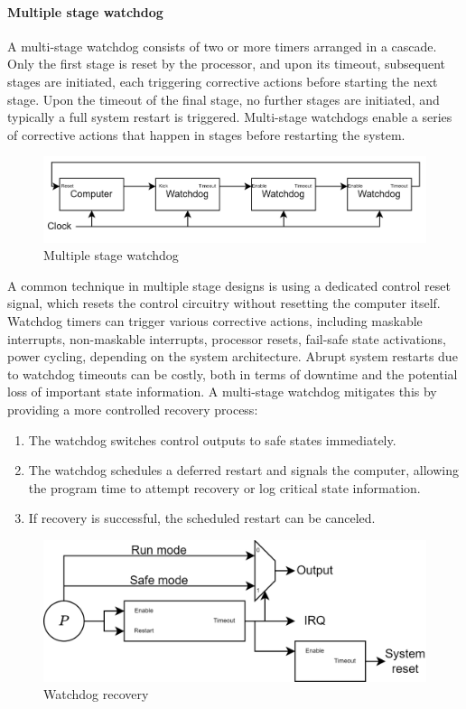\paragraph*{Multiple stage watchdog}
A multi-stage watchdog consists of two or more timers arranged in a cascade. 
Only the first stage is reset by the processor, and upon its timeout, subsequent stages are initiated, each triggering corrective actions before starting the next stage.
Upon the timeout of the final stage, no further stages are initiated, and typically a full system restart is triggered.
Multi-stage watchdogs enable a series of corrective actions that happen in stages before restarting the system.
\begin{figure}[H]
    \centering
    \includegraphics[width=0.75\linewidth]{images/swdog1.png}
    \caption{Multiple stage watchdog}
\end{figure}
A common technique in multiple stage designs is using a dedicated control reset signal, which resets the control circuitry without resetting the computer itself. 
Watchdog timers can trigger various corrective actions, including maskable interrupts, non-maskable interrupts, processor resets, fail-safe state activations, power cycling, depending on the system architecture.
Abrupt system restarts due to watchdog timeouts can be costly, both in terms of downtime and the potential loss of important state information. 
A multi-stage watchdog mitigates this by providing a more controlled recovery process:
\begin{enumerate}
    \item The watchdog switches control outputs to safe states immediately.
    \item The watchdog schedules a deferred restart and signals the computer, allowing the program time to attempt recovery or log critical state information.
    \item If recovery is successful, the scheduled restart can be canceled.
\end{enumerate}
\begin{figure}[H]
    \centering
    \includegraphics[width=0.75\linewidth]{images/wdog2.png}
    \caption{Watchdog recovery}
\end{figure}

